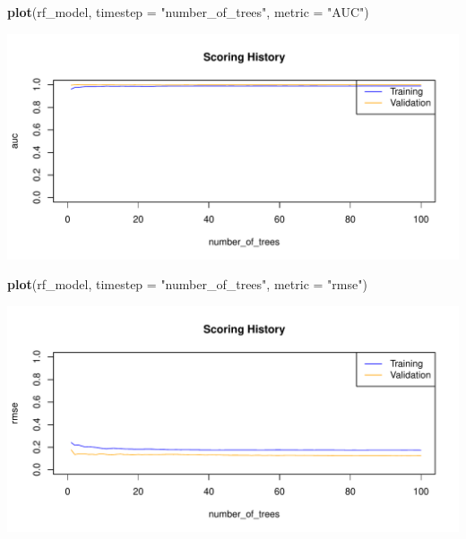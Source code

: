 \documentclass[]{article}
\newenvironment{Shaded}{\begin{snugshade}}{\end{snugshade}}
\newcommand{\KeywordTok}[1]{\textcolor[rgb]{0.13,0.29,0.53}{\textbf{{#1}}}}
\newcommand{\DataTypeTok}[1]{\textcolor[rgb]{0.13,0.29,0.53}{{#1}}}
\newcommand{\StringTok}[1]{\textcolor[rgb]{0.31,0.60,0.02}{{#1}}}
\newcommand{\NormalTok}[1]{{#1}}
\begin{document}
\begin{Shaded}
\begin{Highlighting}[]
\KeywordTok{plot}\NormalTok{(rf_model,}
     \DataTypeTok{timestep =} \StringTok{"number_of_trees"}\NormalTok{,}
     \DataTypeTok{metric =} \StringTok{"AUC"}\NormalTok{)}
\end{Highlighting}
\end{Shaded}

\begin{center}\includegraphics{webinar_code_files/figure-latex/unnamed-chunk-55-1} \end{center}

\begin{Shaded}
\begin{Highlighting}[]
\KeywordTok{plot}\NormalTok{(rf_model,}
     \DataTypeTok{timestep =} \StringTok{"number_of_trees"}\NormalTok{,}
     \DataTypeTok{metric =} \StringTok{"rmse"}\NormalTok{)}
\end{Highlighting}
\end{Shaded}

\begin{center}\includegraphics{webinar_code_files/figure-latex/unnamed-chunk-56-1} \end{center}
\end{document}
